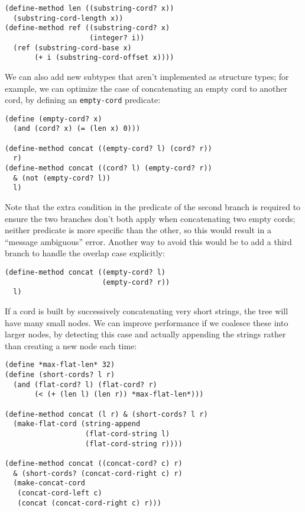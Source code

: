 \documentclass{acm_proc_article-sp}
\newcommand{\code}[1]{\texttt{#1}}
\begin{document}
\begin{verbatim}
(define-method len ((substring-cord? x))
  (substring-cord-length x))
(define-method ref ((substring-cord? x)
                    (integer? i))
  (ref (substring-cord-base x)
       (+ i (substring-cord-offset x))))
\end{verbatim}

We can also add new subtypes that aren't implemented as structure
types; for example, we can optimize the case of concatenating an empty
cord to another cord, by defining an \code{empty-cord} predicate:

\begin{verbatim}
(define (empty-cord? x)
  (and (cord? x) (= (len x) 0)))

(define-method concat ((empty-cord? l) (cord? r))
  r)
(define-method concat ((cord? l) (empty-cord? r))
  & (not (empty-cord? l))
  l)
\end{verbatim}

Note that the extra condition in the predicate of the second branch is
required to ensure the two branches don't both apply when concatenating
two empty cords; neither predicate is more specific than the other, so
this would result in a ``message ambiguous'' error.  Another way to
avoid this would be to add a third branch to handle the overlap case
explicitly:

\begin{verbatim}
(define-method concat ((empty-cord? l)
                       (empty-cord? r))
  l)
\end{verbatim}

If a cord is built by successively concatenating very short strings,
the tree will have many small nodes.  We can improve performance if we
coalesce these into larger nodes, by detecting this case and actually
appending the strings rather than creating a new node each time:

\begin{verbatim}
(define *max-flat-len* 32)
(define (short-cords? l r)
  (and (flat-cord? l) (flat-cord? r)
       (< (+ (len l) (len r)) *max-flat-len*)))

(define-method concat (l r) & (short-cords? l r)
  (make-flat-cord (string-append
                   (flat-cord-string l)
                   (flat-cord-string r))))

(define-method concat ((concat-cord? c) r)
  & (short-cords? (concat-cord-right c) r)
  (make-concat-cord
   (concat-cord-left c)
   (concat (concat-cord-right c) r)))
\end{verbatim}
\end{document}

